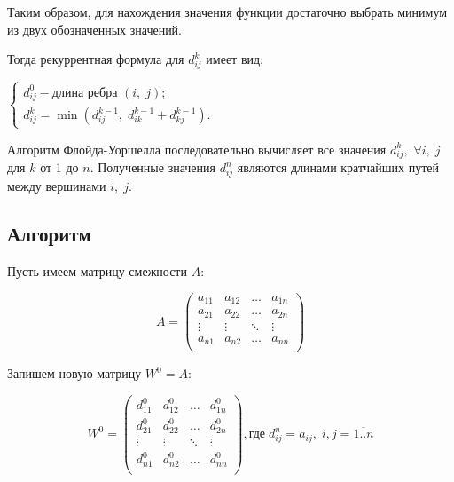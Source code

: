 \documentclass{article}
\begin{document}
	Таким образом, для нахождения значения функции достаточно выбрать минимум из двух обозначенных значений.
	
	Тогда рекуррентная формула для \(d_{i j}^k\) имеет вид:
	
	\(
		\left\{
			\begin{array}{ll}
				d_{i j}^0 - \mbox{длина ребра } (i,\;j); \\
				d_{i j}^{k} = \min (d_{i j}^{k-1},\; d_{i k}^{k-1} + d_{k j}^{k-1}).
			\end{array}
		\right.
	\)
	
	Алгоритм Флойда-Уоршелла последовательно вычисляет все значения \(d_{i j}^{k},\) \(\forall i,\; j\) для \(k\) от 1 до \(n\). Полученные значения \(d_{i j}^{n}\) являются длинами кратчайших путей между вершинами \(i,\; j.\)
	
	\subsection{Алгоритм}
	
		Пусть имеем матрицу смежности $A$:
		
		\begin{displaymath}
			A =
			\left(
				\begin{array}{cccc}
					a_{11} & a_{12} & \dots  & a_{1n} \\
					a_{21} & a_{22} & \dots  & a_{2n} \\
					\vdots & \vdots & \ddots & \vdots \\
					a_{n1} & a_{n2} & \dots  & a_{nn} \\
				\end{array} 
			\right)
		\end{displaymath}
		
		Запишем новую матрицу $W^0 = A$:
		
		\begin{displaymath}
			W^0 =
			\left(
				\begin{array}{cccc}
					d_{11}^{0} & d_{12}^{0} & \dots  & d_{1n}^{0} \\
					d_{21}^{0} & d_{22}^{0} & \dots  & d_{2n}^{0} \\
					\vdots     & \vdots     & \ddots & \vdots     \\
					d_{n1}^{0} & d_{n2}^{0} & \dots  & d_{nn}^{0} \\
				\end{array} 
			\right), \mbox{где}\; d_{ij}^{n} = a_{ij},\;i,j=\overline{1..n}
		\end{displaymath}
		
\end{document}
